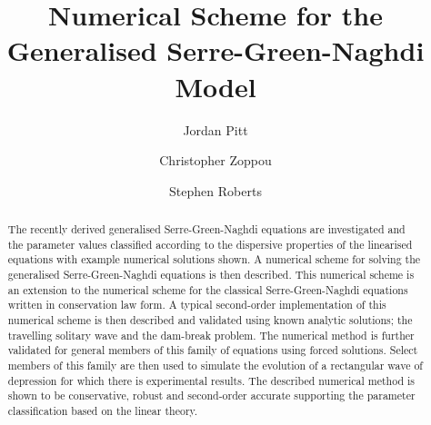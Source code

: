 \documentclass[10pt]{elsarticle}
\newcommand{\hl}[1]{{\color[rgb]{1,0,0}#1}}
\begin{document}
	

\begin{frontmatter}

\title{Numerical Scheme for the Generalised Serre-Green-Naghdi Model}
\author[label1]{Jordan Pitt}
\author[label1]{Christopher Zoppou}
\author[label1]{Stephen Roberts}
\address[label1]{Australian National University, Canberra}

\begin{abstract}
The recently derived generalised Serre-Green-Naghdi equations are investigated and the parameter values classified according to the dispersive properties of the linearised equations with example numerical solutions shown. A numerical scheme for solving the generalised Serre-Green-Naghdi equations is then described. This numerical scheme is an extension to the numerical scheme for the classical Serre-Green-Naghdi equations written in conservation law form. A typical second-order implementation of this numerical scheme is then described and validated using known analytic solutions; the travelling solitary wave and the dam-break problem. The numerical method is further validated for general members of this family of equations using forced solutions. \hl{Select members of this family are then used to simulate the evolution of a rectangular wave of depression for which there is experimental results.} The described numerical method is shown to be conservative, robust and second-order accurate supporting the parameter classification based on the linear theory.

\end{abstract}

%
%

\end{frontmatter}



\end{document}
